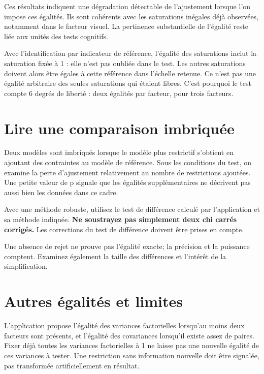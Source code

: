 \documentclass[
  french,
  11pt,
  a4paper,
  DIV=11,
  numbers=noendperiod]{scrreprt}
\begin{document}
Ces résultats indiquent une dégradation détectable de l'ajustement
lorsque l'on impose ces égalités. Ils sont cohérents avec les
saturations inégales déjà observées, notamment dans le facteur visuel.
La pertinence substantielle de l'égalité reste liée aux unités des tests
cognitifs.

Avec l'identification par indicateur de référence, l'égalité des
saturations inclut la saturation fixée à 1 : elle n'est pas oubliée dans
le test. Les autres saturations doivent alors être égales à cette
référence dans l'échelle retenue. Ce n'est pas une égalité arbitraire
des seules saturations qui étaient libres. C'est pourquoi le test compte
6 degrés de liberté : deux égalités par facteur, pour trois facteurs.

\section{Lire une comparaison
imbriquée}\label{lire-une-comparaison-imbriquuxe9e}

Deux modèles sont imbriqués lorsque le modèle plus restrictif s'obtient
en ajoutant des contraintes au modèle de référence. Sous les conditions
du test, on examine la perte d'ajustement relativement au nombre de
restrictions ajoutées. Une petite valeur de p signale que les égalités
supplémentaires ne décrivent pas aussi bien les données dans ce cadre.

Avec une méthode robuste, utilisez le test de différence calculé par
l'application et sa méthode indiquée. \textbf{Ne soustrayez pas
simplement deux chi carrés corrigés.} Les corrections du test de
différence doivent être prises en compte.

Une absence de rejet ne prouve pas l'égalité exacte; la précision et la
puissance comptent. Examinez également la taille des différences et
l'intérêt de la simplification.

\section{Autres égalités et
limites}\label{autres-uxe9galituxe9s-et-limites}

L'application propose l'égalité des variances factorielles lorsqu'au
moins deux facteurs sont présents, et l'égalité des covariances
lorsqu'il existe assez de paires. Fixer déjà toutes les variances
factorielles à 1 ne laisse pas une nouvelle égalité de ces variances à
tester. Une restriction sans information nouvelle doit être signalée,
pas transformée artificiellement en résultat.
\end{document}
